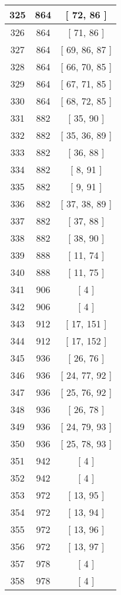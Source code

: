 \begin{center}
\begin{longtable}[H]{|| c c c ||}
\hline
325 & 864 & [ 72, 86 ] \\ 
\hline
326 & 864 & [ 71, 86 ] \\ 
\hline
327 & 864 & [ 69, 86, 87 ] \\ 
\hline
328 & 864 & [ 66, 70, 85 ] \\ 
\hline
329 & 864 & [ 67, 71, 85 ] \\ 
\hline
330 & 864 & [ 68, 72, 85 ] \\ 
\hline
331 & 882 & [ 35, 90 ] \\ 
\hline
332 & 882 & [ 35, 36, 89 ] \\ 
\hline
333 & 882 & [ 36, 88 ] \\ 
\hline
334 & 882 & [ 8, 91 ] \\ 
\hline
335 & 882 & [ 9, 91 ] \\ 
\hline
336 & 882 & [ 37, 38, 89 ] \\ 
\hline
337 & 882 & [ 37, 88 ] \\ 
\hline
338 & 882 & [ 38, 90 ] \\ 
\hline
339 & 888 & [ 11, 74 ] \\ 
\hline
340 & 888 & [ 11, 75 ] \\ 
\hline
341 & 906 & [ 4 ] \\ 
\hline
342 & 906 & [ 4 ] \\ 
\hline
343 & 912 & [ 17, 151 ] \\ 
\hline
344 & 912 & [ 17, 152 ] \\ 
\hline
345 & 936 & [ 26, 76 ] \\ 
\hline
346 & 936 & [ 24, 77, 92 ] \\ 
\hline
347 & 936 & [ 25, 76, 92 ] \\ 
\hline
348 & 936 & [ 26, 78 ] \\ 
\hline
349 & 936 & [ 24, 79, 93 ] \\ 
\hline
350 & 936 & [ 25, 78, 93 ] \\ 
\hline
351 & 942 & [ 4 ] \\ 
\hline
352 & 942 & [ 4 ] \\ 
\hline
353 & 972 & [ 13, 95 ] \\ 
\hline
354 & 972 & [ 13, 94 ] \\ 
\hline
355 & 972 & [ 13, 96 ] \\ 
\hline
356 & 972 & [ 13, 97 ] \\ 
\hline
357 & 978 & [ 4 ] \\ 
\hline
358 & 978 & [ 4 ] \\ 
\hline
\end{longtable}
\end{center}
